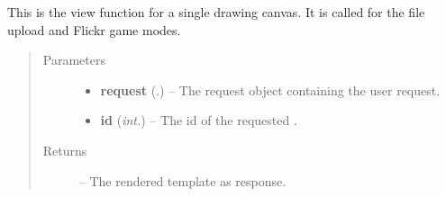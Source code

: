 \documentclass[letterpaper,10pt,english]{sphinxmanual}
\begin{document}

\begin{fulllineitems}
\label{Contour.contour:Contour.contour.views.canvas}
This is the view function for a single drawing canvas. It is called for the file upload and Flickr game modes.
\begin{quote}\begin{description}
\item[{Parameters}] \leavevmode\begin{itemize}
\item {} 
\textbf{request} (.) -- The request object containing the user request.

\item {} 
\textbf{id} (\emph{int.}) -- The id of the requested {\hyperref[Contour.contour:Contour.contour.models.Image]{}}.

\end{itemize}

\item[{Returns}] \leavevmode
{} -- The rendered template as response.

\end{description}\end{quote}

\end{fulllineitems}

\end{document}
